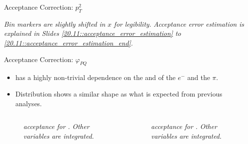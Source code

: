 \begin{frame}{Acceptance Correction: $p_T^2$}
    \begin{flushright}
        \tiny{\textit{Bin markers are slightly shifted in $x$ for legibility.}}
        \tiny{\textit{Acceptance error estimation is explained in Slides \textcolor{efd_purple}{\ref{20.11::acceptance_error_estimation}} to \textcolor{efd_purple}{\ref{20.11::acceptance_error_estimation_end}}.}}
    \end{flushright}
\end{frame}

\begin{frame}{Acceptance Correction: $\varphi_{PQ}$}
    \label{11.56::phipq}

    \begin{itemize}
        \item
             has a highly non-trivial dependence on the \ef{$\theta$} and \ef{$\varphi$} of the $e^-$ and the $\pi$.

        \vspace{6pt}
        \item
            Distribution shows a similar shape as what is expected from previous analyses.
    \end{itemize}

    \vspace{-12pt}
    \begin{columns}
        \begin{column}{.49\linewidth}
            \begin{center}
                \begin{figure}[t]
                    \scriptsize{\textit{
                         acceptance for \ef{$\pi^-$}.
                        Other variables are integrated.
                    }}
                \end{figure}
            \end{center}
        \end{column}

        \begin{column}{.49\linewidth}
            \begin{center}
                \begin{figure}[t]
                    \scriptsize{\textit{
                         acceptance for \ef{$\pi^+$}.
                        Other variables are integrated.
                    }}
                \end{figure}
            \end{center}
        \end{column}
    \end{columns}


\end{frame}
